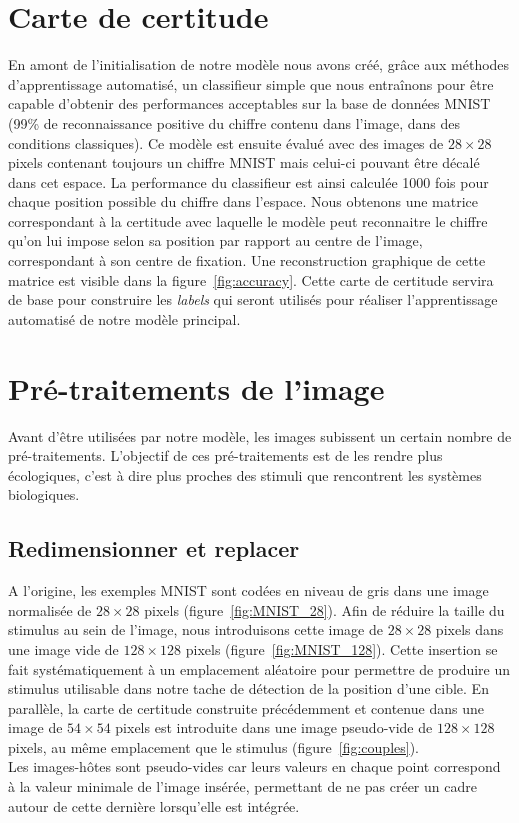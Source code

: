 \section{Carte de certitude}
En amont de l'initialisation de notre modèle nous avons créé, grâce aux méthodes d'apprentissage automatisé, un classifieur simple que nous entraînons pour être capable d'obtenir des performances acceptables sur la base de données MNIST (99\% de reconnaissance positive du chiffre contenu dans l'image, dans des conditions classiques).
Ce modèle est ensuite évalué avec des images de $28 \times 28$ pixels contenant toujours un  chiffre MNIST mais celui-ci pouvant être décalé dans cet espace.
La performance du classifieur est ainsi calculée 1000 fois pour chaque position possible du chiffre dans l'espace. 
Nous obtenons une matrice correspondant à la certitude avec laquelle le modèle peut reconnaitre le chiffre qu'on lui impose selon sa position par rapport au centre de l'image, correspondant à son centre de fixation.
Une reconstruction graphique de cette matrice est visible dans la figure~\ref{fig:accuracy}.
Cette carte de certitude servira de base pour construire les \textit{labels} qui seront utilisés pour réaliser l'apprentissage automatisé de notre modèle principal.

\section{Pré-traitements de l'image}
Avant d'être utilisées par notre modèle, les images subissent un certain nombre de pré-traitements. 
L'objectif de ces pré-traitements est de les rendre plus écologiques, c'est à dire plus proches des stimuli que rencontrent les systèmes biologiques.

\subsection{Redimensionner et replacer}
A l'origine, les exemples MNIST sont codées en niveau de gris dans une image normalisée de $28\times 28$ pixels (figure~\ref{fig:MNIST_28}).
Afin de réduire la taille du stimulus au sein de l'image, nous introduisons cette image de $28\times 28$ pixels dans une image vide de $128\times 128$ pixels (figure~\ref{fig:MNIST_128}).
Cette insertion se fait systématiquement à un emplacement aléatoire pour permettre de produire un stimulus utilisable dans notre tache de détection de la position d'une cible.
En parallèle, la carte de certitude construite précédemment et contenue dans une image de $54\times 54$ pixels est introduite dans une image pseudo-vide de $128\times 128$ pixels, au même emplacement que le stimulus (figure~\ref{fig:couples}). \\
Les images-hôtes sont pseudo-vides car leurs valeurs en chaque point correspond à la valeur minimale de l'image insérée, permettant de ne pas créer un cadre autour de cette dernière lorsqu'elle est intégrée.

